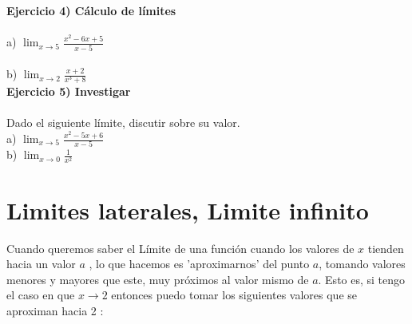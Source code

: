 \documentclass[11pt, a4paper]{article}
\begin{document}
{\textbf{ Ejercicio 4) C\'alculo de l\'imites } \\ \\ 
a) $ \displaystyle  \lim_{x \to 5} \frac{x^2 - 6x + 5}{x-5} $ \\ \\ 
b) $ \displaystyle  \lim_{x \to 2} \frac{x+2}{x^3 + 8}  $ \\ 

\textbf{ Ejercicio 5) Investigar } \\ \\ 
Dado el siguiente l\'imite, discutir sobre su valor. \\ 
a) $ \displaystyle  \lim_{x \to 5} \frac{x^2 - 5x + 6}{x-5} $ \\ 
b) $ \displaystyle  \lim_{x \to 0} \frac{1}{x^2}  $

\section{Limites laterales, Limite infinito}

Cuando queremos saber el L\'imite de una funci\'on cuando los valores de {\color{blue} $x$} tienden hacia un valor {\color{blue} $a$ }, lo que hacemos es 'aproximarnos' del punto {\color{blue} $a$}, tomando valores menores y mayores  que este, muy pr\'oximos al valor mismo de {\color{blue} $a$}. Esto es, si tengo el caso en que {\color{blue} $x \to 2$ } entonces puedo tomar los siguientes valores que se aproximan hacia 2 : 

}
\end{document}
